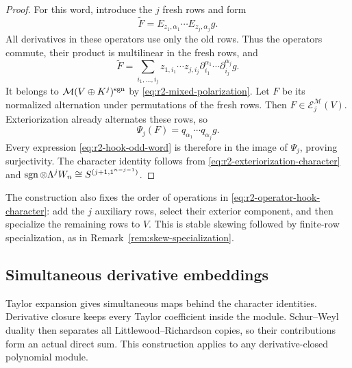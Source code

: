 \begin{proof}
For this word, introduce the $j$ fresh rows and form
\[
 \widetilde F
       =E_{z_1,\alpha_1}\cdots E_{z_j,\alpha_j}g.
\]
All derivatives in these operators use only the old rows.
Thus the operators commute, their product is multilinear in the
fresh rows, and
\[
 \widetilde F
   =\sum_{i_1,\ldots,i_j}
        z_{1,i_1}\cdots z_{j,i_j}
        \partial_{i_1}^{\alpha_1}\cdots
        \partial_{i_j}^{\alpha_j}g.
\]
It belongs to $\mathcal M(V\oplus K^j)^{\operatorname{sgn}}$ by
\eqref{eq:r2-mixed-polarization}.  Let $F$ be its normalized
alternation under permutations of the fresh rows.
Then $F\in\mathscr E_j^{\mathcal M}(V)$.
Exteriorization already alternates these rows, so
\[
                  \Psi_j(F)
                       =q_{\alpha_1}\cdots q_{\alpha_j}g.
\]
Every expression \eqref{eq:r2-hook-odd-word} is therefore in the image
of $\Psi_j$, proving surjectivity.  The character identity follows from
\eqref{eq:r2-exteriorization-character} and
$\operatorname{sgn}\otimes\Lambda^jW_n\cong S^{(j+1,1^{n-j-1})}$.
\end{proof}

The construction also fixes the order of operations in
\eqref{eq:r2-operator-hook-character}: add the $j$ auxiliary rows,
select their exterior component, and then specialize the remaining
rows to $V$.  This is stable skewing followed by finite-row
specialization, as in Remark~\ref{rem:skew-specialization}.


\subsection{Simultaneous derivative embeddings}

Taylor expansion gives simultaneous maps behind the character
identities.  Derivative closure keeps every Taylor coefficient
inside the module.  Schur--Weyl duality then separates all
Littlewood--Richardson copies, so their contributions form an
actual direct sum.  This construction applies to any
derivative-closed polynomial module.

